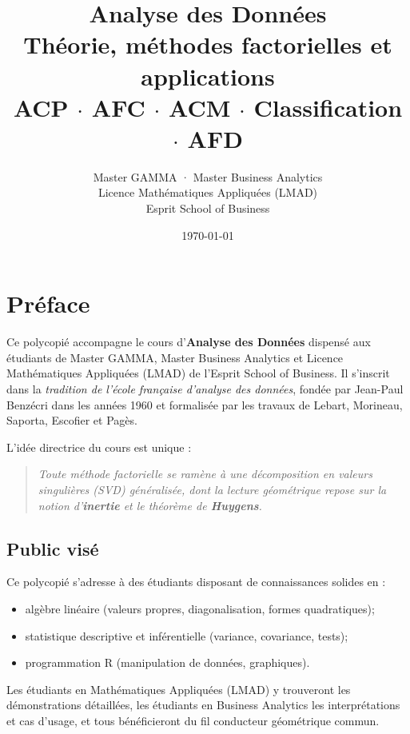 \documentclass[11pt, a4paper, openany]{book}
\title{
  \vspace{2cm}
  {\Huge \textbf{Analyse des Données}}\\[0.6cm]
  {\Large Théorie, méthodes factorielles et applications}\\[0.5cm]
  {\large ACP $\cdot$ AFC $\cdot$ ACM $\cdot$ Classification $\cdot$ AFD}\\[2cm]
}
\author{
  \Large Master GAMMA · Master Business Analytics\\[0.2cm]
  \large Licence Mathématiques Appliquées (LMAD)\\[0.6cm]
  \large Esprit School of Business
}
\date{\today}
\theoremstyle{plain}
\theoremstyle{definition}
\theoremstyle{remark}
\newcommand{\1}{\mathds{1}}
\begin{document}
\frontmatter
\maketitle

\chapter*{Préface}

Ce polycopié accompagne le cours d'\textbf{Analyse des Données} dispensé aux
étudiants de Master GAMMA, Master Business Analytics et Licence Mathématiques
Appliquées (LMAD) de l'Esprit School of Business. Il s'inscrit dans la
\textit{tradition de l'école française d'analyse des données}, fondée par
Jean-Paul Benzécri dans les années 1960 et formalisée par les travaux de
Lebart, Morineau, Saporta, Escofier et Pagès.

L'idée directrice du cours est unique :
\begin{quote}
\textit{Toute méthode factorielle se ramène à une décomposition en valeurs
singulières (SVD) généralisée, dont la lecture géométrique repose sur la
notion d'\textbf{inertie} et le théorème de \textbf{Huygens}.}
\end{quote}

\section*{Public visé}
Ce polycopié s'adresse à des étudiants disposant de connaissances solides en :
\begin{itemize}
  \item algèbre linéaire (valeurs propres, diagonalisation, formes quadratiques);
  \item statistique descriptive et inférentielle (variance, covariance, tests);
  \item programmation R (manipulation de données, graphiques).
\end{itemize}
Les étudiants en Mathématiques Appliquées (LMAD) y trouveront les démonstrations
détaillées, les étudiants en Business Analytics les interprétations et cas
d'usage, et tous bénéficieront du fil conducteur géométrique commun.
\end{document}

